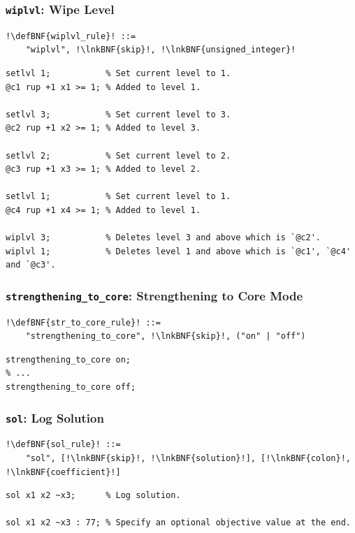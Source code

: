 \documentclass[a4paper]{article}
\newcommand{\defBNF}[1]{\hypertarget{def:#1}{<\detokenize{#1}>}}
\newcommand{\lnkBNF}[1]{\hyperlink{def:#1}{<\detokenize{#1}>}}
\begin{document}
\subsubsection{\texttt{wiplvl}: Wipe Level}\label{sec:rules-wiplvl}
\begin{lstlisting}
!\defBNF{wiplvl_rule}! ::=
	"wiplvl", !\lnkBNF{skip}!, !\lnkBNF{unsigned_integer}!
\end{lstlisting}
\begin{lstlisting}[language=veripb]
setlvl 1;           % Set current level to 1.
@c1 rup +1 x1 >= 1; % Added to level 1.

setlvl 3;           % Set current level to 3.
@c2 rup +1 x2 >= 1; % Added to level 3.

setlvl 2;           % Set current level to 2.
@c3 rup +1 x3 >= 1; % Added to level 2.

setlvl 1;           % Set current level to 1.
@c4 rup +1 x4 >= 1; % Added to level 1.

wiplvl 3;           % Deletes level 3 and above which is `@c2'.
wiplvl 1;           % Deletes level 1 and above which is `@c1', `@c4' and `@c3'.
\end{lstlisting}


\subsubsection{\texttt{strengthening\_to\_core}: Strengthening to Core Mode}\label{sec:rules-strengthening-to-core}
\begin{lstlisting}
!\defBNF{str_to_core_rule}! ::=
	"strengthening_to_core", !\lnkBNF{skip}!, ("on" | "off")
\end{lstlisting}
\begin{lstlisting}[language=veripb]
strengthening_to_core on;
% ...
strengthening_to_core off;
\end{lstlisting}


\subsubsection{\texttt{sol}: Log Solution}\label{sec:rules-sol}
\begin{lstlisting}
!\defBNF{sol_rule}! ::=
	"sol", [!\lnkBNF{skip}!, !\lnkBNF{solution}!], [!\lnkBNF{colon}!, !\lnkBNF{coefficient}!]
\end{lstlisting}
\begin{lstlisting}[language=veripb]
sol x1 x2 ~x3;      % Log solution.

sol x1 x2 ~x3 : 77; % Specify an optional objective value at the end.
\end{lstlisting}
\end{document}
